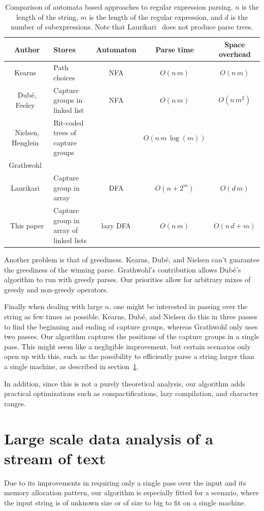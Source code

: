 \documentclass[11pt,a4paper,twoside,openright]{Thesis}
\theoremstyle{definition}
\newcommand{\Secref}[1]{section~\ref{sec:#1}}
\begin{document}
\begin{table}
\begin{tabular}{c|>{\centering}m{3cm}ccc}
  Author & Stores & Automaton & Parse time & Space overhead \\
  \hline
  \hline
  Kearns~\cite{Kear91a}& Path choices & NFA & $O(n\,m)$ & $O(n\, m)$ \\
  \hline
  Dub\'e, Feeley~\cite{Dube00a}& Capture groups in linked
  list & NFA & $O(n\,m)$ & $O(n\, m^2)$\\
  Nielsen, Henglein~\cite{Niel11a} & Bit-coded trees of capture groups  & & $O(n\, m\, \log(m))$ \\
  Grathwohl~\cite{Grat13a} \\
  \hline
  Laurikari~\cite{Laur00a}& Capture group in array & DFA &
  $O(n+2^m)$ & $O(d\, m)$\\
  This paper & Capture group in array of linked lists & lazy DFA
  & $O(n\, m)$ & $O(n\, d + m)$ \\
\end{tabular}
\caption{Comparison of automata based approaches to regular expression
parsing. $n$ is the length of the string, $m$ is the length of the regular
expression, and $d$ is the number of subexpressions. Note that
Laurikari~\cite{Laur00a} does not produce parse trees.}
\end{table}

Another problem is that of greediness. Kearns, Dub\'e, and Nielsen can't
guarantee the greediness of the winning parse. Grathwohl's contribution
allows Dub\'e's algorithm to run with greedy parses. Our priorities allow for
arbitrary mixes of greedy and non-greedy operators.

Finally when dealing with large $n$, one might be interested in passing over
the string as few times as possible. Kearns, Dub\'e, and Nielsen do this in
three passes to find the beginning and ending of capture groups, whereas
Grathwohl only uses two passes. Our algorithm captures the positions of the
capture groups in a single pass. This might seem like a negligible 
improvement, but certain scenarios only open up with this, such as the 
possibility to efficiently parse a string larger than a single machine, as 
described in \Secref{stream}.

In addition, since this is not a purely theoretical analysis, our algorithm
adds practical optimizations such as compactifications, lazy compilation, and
character ranges.

\section{Large scale data analysis of a stream of text}\label{sec:stream}
Due to its improvements in requiring only a single pass over the input and
its memory allocation pattern, our algorithm is especially fitted for a
scenario, where the input string is of unknown size or of size to big to fit
on a single machine.
\end{document}

